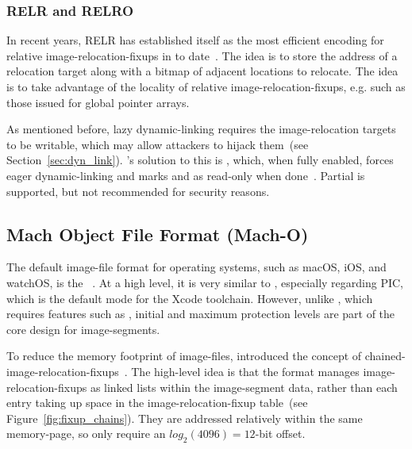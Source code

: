 \subsubsection{RELR and RELRO}

In recent years, RELR has established itself as the most efficient encoding for relative \glspl{image-relocation-fixup} in  to date~\cite{elf-relr}. The idea is to store the address of a relocation target along with a bitmap of adjacent locations to relocate. The idea is to take advantage of the locality of relative \glspl{image-relocation-fixup}, e.g. such as those issued for global pointer arrays.

As mentioned before, lazy \gls{dynamic-linking} requires the \gls{image-relocation} targets to be writable, which may allow attackers to hijack them~(see Section~\ref{sec:dyn_link}). 's solution to this is , which, when fully enabled, forces eager \gls{dynamic-linking} and marks  and  as read-only when done~\cite{ld}. Partial  is supported, but not recommended for security reasons.

\subsection{Mach Object File Format (Mach-O)}
\label{sec:macho}

The default \gls{image-file} format for  operating systems, such as macOS, iOS, and watchOS, is the ~\cite{macho-spec}. At a high level, it is very similar to , especially regarding \gls{PIC}, which is the default mode for the  Xcode toolchain. However, unlike , which requires features such as , initial and maximum protection levels are part of the  core design for \glspl{image-segment}.

To reduce the memory footprint of \glspl{image-file},  introduced the concept of \gls{chained-image-relocation-fixups}~\cite{dyld_chains}. The high-level idea is that the  format manages \glspl{image-relocation-fixup} as linked lists within the \gls{image-segment} data, rather than each entry taking up space in the \gls{image-relocation-fixup} table~(see Figure~\ref{fig:fixup_chains}). They are addressed relatively within the same \gls{memory-page}, so only require an $log_2(4096) = 12$-bit offset.

